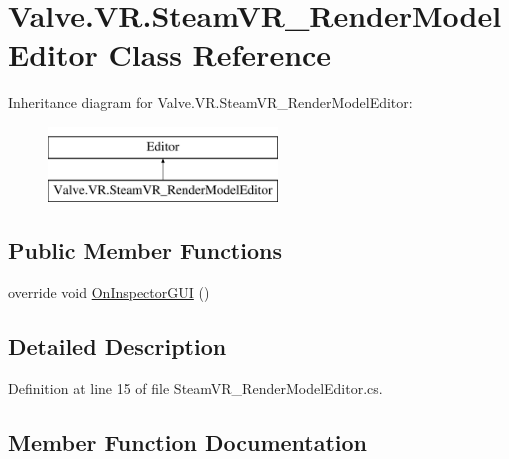 \hypertarget{class_valve_1_1_v_r_1_1_steam_v_r___render_model_editor}{}\section{Valve.\+V\+R.\+Steam\+V\+R\+\_\+\+Render\+Model\+Editor Class Reference}
\label{class_valve_1_1_v_r_1_1_steam_v_r___render_model_editor}
Inheritance diagram for Valve.\+V\+R.\+Steam\+V\+R\+\_\+\+Render\+Model\+Editor\+:\begin{figure}[H]
\begin{center}
\leavevmode
\includegraphics[height=2.000000cm]{class_valve_1_1_v_r_1_1_steam_v_r___render_model_editor}
\end{center}
\end{figure}
\subsection*{Public Member Functions}
\begin{DoxyCompactItemize}
\item 
override void \mbox{\hyperlink{class_valve_1_1_v_r_1_1_steam_v_r___render_model_editor_ad5b2cc7179ea0d7df2ac3e473ce181be}{On\+Inspector\+G\+UI}} ()
\end{DoxyCompactItemize}


\subsection{Detailed Description}


Definition at line 15 of file Steam\+V\+R\+\_\+\+Render\+Model\+Editor.\+cs.



\subsection{Member Function Documentation}
\mbox{\label{class_valve_1_1_v_r_1_1_steam_v_r___render_model_editor_ad5b2cc7179ea0d7df2ac3e473ce181be}} 
